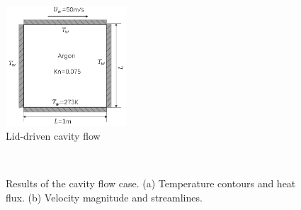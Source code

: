 \begin{figure}
  \centering
  \includegraphics[width=0.4\textwidth]{img/ldc.pdf}
  \caption{Lid-driven cavity flow}\label{ldc}
\end{figure}

\begin{figure}[htbp]
\centering
{} ~
\caption{
Results of the cavity flow case. (a) Temperature contours and heat flux. (b) Velocity magnitude and streamlines.
}\label{ldc_UT}
\end{figure}

